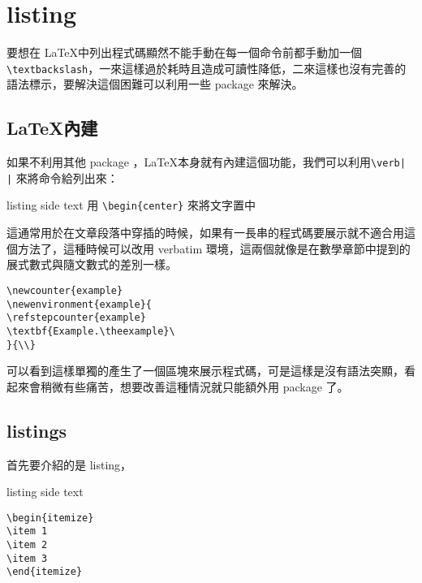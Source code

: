 \chapter{listing}

要想在 \LaTeX 中列出程式碼顯然不能手動在每一個命令前都手動加一個\verb|\textbackslash|，一來這樣過於耗時且造成可讀性降低，二來這樣也沒有完善的語法標示，要解決這個困難可以利用一些 package 來解決。

\section{\LaTeX 內建}

如果不利用其他 package ，\LaTeX 本身就有內建這個功能，我們可以利用\verb`\verb| |` 來將命令給列出來：

\begin{tcblisting}{listing side text}
用 \verb|\begin{center}| 來將文字置中
\end{tcblisting}

這通常用於在文章段落中穿插的時候，如果有一長串的程式碼要展示就不適合用這個方法了，這種時候可以改用 verbatim 環境，這兩個就像是在數學章節中提到的展式數式與隨文數式的差別一樣。

\begin{tcblisting}{}
\begin{verbatim}
\newcounter{example}
\newenvironment{example}{
\refstepcounter{example}
\textbf{Example.\theexample}\ 
}{\\}
\end{verbatim}
\end{tcblisting}

可以看到這樣單獨的產生了一個區塊來展示程式碼，可是這樣是沒有語法突顯，看起來會稍微有些痛苦，想要改善這種情況就只能額外用 package 了。

\section{listings}

首先要介紹的是 listing，

\begin{tcblisting}{listing side text}
\begin{lstlisting}
\begin{itemize}
\item 1
\item 2
\item 3
\end{itemize}
\end{lstlisting}
\end{tcblisting}

